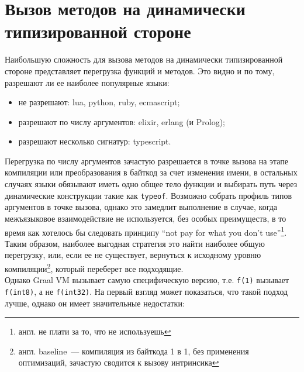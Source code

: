 \documentclass[times,specification,annotation]{itmo-student-thesis}
\begin{document}
\section{Вызов методов на динамически типизированной стороне}
Наибольшую сложность для вызова методов на динамически типизированной стороне представляет перегрузка функций и методов. Это видно и по тому, разрешают ли ее наиболее популярные языки:
\begin{itemize}
	\item не разрешают: lua, python, ruby, ecmascript;
	\item разрешают по числу аргументов: elixir, erlang (и Prolog);
	\item разрешают несколько сигнатур: typescript.
\end{itemize}
Перегрузка по числу аргументов зачастую разрешается в точке вызова на этапе компиляции или преобразования в байткод за счет изменения имени, в остальных случаях языки обязывают иметь одно общее тело функции и выбирать путь через динамические конструкции такие как \texttt{typeof}. Возможно собрать профиль типов аргументов в точке вызова, однако это замедлит выполнение в случае, когда межъязыковое взаимодействие не используется, без особых преимуществ, в то время как хотелось бы следовать принципу ``not pay for what you don't use''\footnote{англ. не плати за то, что не используешь}. Таким образом, наиболее выгодная стратегия это найти наиболее общую перегрузку, или, если ее не существует, вернуться к исходному уровню компиляции\footnote{англ. baseline~--- компиляция из байткода 1 в 1, без применения оптимизаций, зачастую сводится к вызову интринсика}, который переберет все подходящие.\\
Однако Graal VM вызывает самую специфическую версию, т.е. \texttt{f(1)} вызывает \texttt{f(int8)}, а не \texttt{f(int32)}. На первый взгляд может показаться, что такой подход лучше, однако он имеет значительные недостатки:\\
\end{document}
